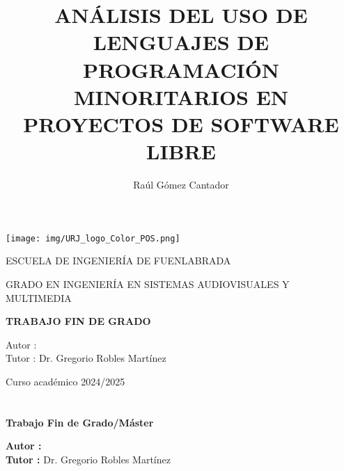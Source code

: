 \documentclass[a4paper, 12pt]{book}
\title{ANÁLISIS DEL USO DE LENGUAJES DE PROGRAMACIÓN MINORITARIOS EN PROYECTOS DE SOFTWARE LIBRE}
\author{Raúl Gómez Cantador}
\makeatletter
\let\thetitle\@title
\let\theauthor\@author
\makeatother
\begin{document}
\renewcommand{\refname}{Bibliografía}  %
\renewcommand{\appendixname}{Apéndice}



\begin{titlepage}
  \begin{center}
    \texttt{[image: img/URJ\_logo\_Color\_POS.png]}

    \vspace{1.75cm}

    \LARGE
    ESCUELA DE INGENIERÍA DE FUENLABRADA
    \vspace{1cm}

    \LARGE
    GRADO EN INGENIERÍA EN SISTEMAS AUDIOVISUALES Y MULTIMEDIA

    \vspace{1cm}
    \LARGE
    \textbf{TRABAJO FIN DE GRADO}

    \vspace{2cm}

    \Large
    \MakeUppercase{\thetitle}

    \vspace{2cm}

    \large
    Autor : \theauthor \\
    Tutor : Dr. Gregorio Robles Martínez\\
    \vspace{1cm}

    \large
    Curso académico 2024/2025

  \end{center}
\end{titlepage}

\newpage
\mbox{}
\thispagestyle{empty} %



\clearpage
{}
\chapter*{}

\vspace{-4cm}
\begin{center}
  \LARGE
  \textbf{Trabajo Fin de Grado/Máster}

  \vspace{1cm}
  \large
  \thetitle

  \vspace{0.8cm}
  \large
  \textbf{Autor :} \theauthor \\
  \textbf{Tutor :} Dr. Gregorio Robles Martínez

\end{center}
\end{document}

